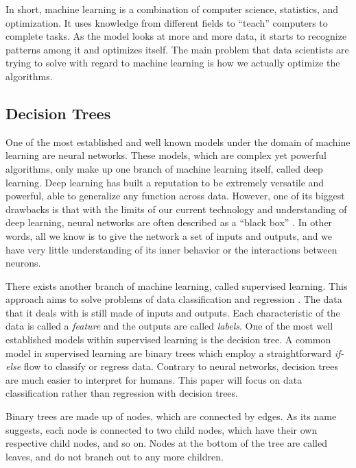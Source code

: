 \documentclass[12pt]{article}
\begin{document}
In short, machine learning is a combination of computer science, statistics, and optimization. It uses knowledge from different fields to ``teach'' computers to complete tasks. As the model looks at more and more data, it starts to recognize patterns among it and optimizes itself. The main problem that data scientists are trying to solve with regard to machine learning is how we actually optimize the algorithms.

\subsection{Decision Trees}

One of the most established and well known models under the domain of machine learning are neural networks. These models, which are complex yet powerful algorithms, only make up one branch of machine learning itself, called deep learning. Deep learning has built a reputation to be extremely versatile and powerful, able to generalize any function across data. However, one of its biggest drawbacks is that with the limits of our current technology and understanding of deep learning, neural networks are often described as a ``black box'' \autocite{Buhrmester_Munch_Arens_2019}. In other words, all we know is to give the network a set of inputs and outputs, and we have very little understanding of its inner behavior or the interactions between neurons.

There exists another branch of machine learning, called supervised learning. This approach aims to solve problems of data classification and regression \autocite{Supervised_unsupervised_learning}. The data that it deals with is still made of inputs and outputs. Each characteristic of the data is called a \textit{feature} and the outputs are called \textit{labels}. One of the most well established models within supervised learning is the decision tree. A common model in supervised learning are binary trees which employ a straightforward \textit{if-else} flow to classify or regress data. Contrary to neural networks, decision trees are much easier to interpret for humans. This paper will focus on data classification rather than regression with decision trees.

Binary trees are made up of nodes, which are connected by edges. As its name suggests, each node is connected to two child nodes, which have their own respective child nodes, and so on. Nodes at the bottom of the tree are called leaves, and do not branch out to any more children.
\end{document}

